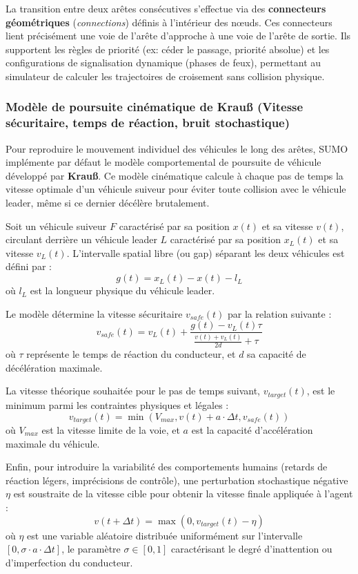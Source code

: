 \documentclass[10pt, a4paper]{article}
\begin{document}
La transition entre deux arêtes consécutives s'effectue via des
\textbf{connecteurs géométriques} (\emph{connections}) définis à
l'intérieur des nœuds. Ces connecteurs lient précisément une voie de
l'arête d'approche à une voie de l'arête de sortie. Ils supportent les
règles de priorité (ex: céder le passage, priorité absolue) et les
configurations de signalisation dynamique (phases de feux), permettant
au simulateur de calculer les trajectoires de croisement sans collision
physique.

\subsubsection{Modèle de poursuite cinématique de Krauß (Vitesse
sécuritaire, temps de réaction, bruit
stochastique)}\label{moduxe8le-de-poursuite-cinuxe9matique-de-krauuxdf-vitesse-suxe9curitaire-temps-de-ruxe9action-bruit-stochastique}

Pour reproduire le mouvement individuel des véhicules le long des
arêtes, SUMO implémente par défaut le modèle comportemental de poursuite
de véhicule développé par \textbf{Krauß}. Ce modèle cinématique calcule
à chaque pas de temps la vitesse optimale d'un véhicule suiveur pour
éviter toute collision avec le véhicule leader, même si ce dernier
décélère brutalement.

Soit un véhicule suiveur \(F\) caractérisé par sa position \(x(t)\) et
sa vitesse \(v(t)\), circulant derrière un véhicule leader \(L\)
caractérisé par sa position \(x_L(t)\) et sa vitesse \(v_L(t)\).
L'intervalle spatial libre (ou gap) séparant les deux véhicules est
défini par : \[g(t) = x_L(t) - x(t) - l_L\] où \(l_L\) est la longueur
physique du véhicule leader.

Le modèle détermine la vitesse sécuritaire \(v_{safe}(t)\) par la
relation suivante :
\[v_{safe}(t) = v_L(t) + \frac{g(t) - v_L(t)\tau}{\frac{v(t) + v_L(t)}{2d} + \tau}\]
où \(\tau\) représente le temps de réaction du conducteur, et \(d\) sa
capacité de décélération maximale.

La vitesse théorique souhaitée pour le pas de temps suivant,
\(v_{target}(t)\), est le minimum parmi les contraintes physiques et
légales :
\[v_{target}(t) = \min\left( V_{max}, v(t) + a \cdot \Delta t, v_{safe}(t) \right)\]
où \(V_{max}\) est la vitesse limite de la voie, et \(a\) est la
capacité d'accélération maximale du véhicule.

Enfin, pour introduire la variabilité des comportements humains (retards
de réaction légers, imprécisions de contrôle), une perturbation
stochastique négative \(\eta\) est soustraite de la vitesse cible pour
obtenir la vitesse finale appliquée à l'agent :
\[v(t + \Delta t) = \max\left( 0, v_{target}(t) - \eta \right)\] où
\(\eta\) est une variable aléatoire distribuée uniformément sur
l'intervalle \([0, \sigma \cdot a \cdot \Delta t]\), le paramètre
\(\sigma \in [0, 1]\) caractérisant le degré d'inattention ou
d'imperfection du conducteur.
\end{document}
